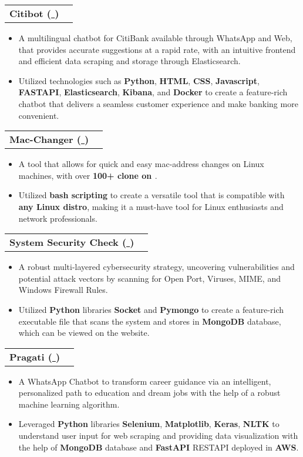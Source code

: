 \documentclass[letterpaper,11pt]{article}
\makeatletter
\newcommand{\myuline}[1]{%
  \uline{\phantom{#1}}%
  \llap{\contour{white}{#1}}%
}
\newcommand{\resumeItem}[1]{
  \item\small{
    {#1 \vspace{-1pt}}
  }
}
\newcommand{\resumeProjectHeading}[2]{
    \item
    \begin{tabular*}{\textwidth}{l@{\extracolsep{\fill}}r}
      #1 & {\color{dark-grey}} \\
    \end{tabular*}\vspace{-4pt}
}
\newcommand{\resumeItemListStart}{\begin{itemize}}
\newcommand{\resumeItemListEnd}{\end{itemize}\vspace{0pt}}
\makeatother
\begin{document}
     \resumeProjectHeading
          {\textbf{Citibot
          (\href{https://github.com/samrath-sudesh-acharya/Citibot}{\myuline {GitHub}})}}{Sept. 2020 -- Nov. 2020}
          \resumeItemListStart
            \resumeItem{A multilingual chatbot for CitiBank available through WhatsApp and Web, that provides accurate suggestions at a rapid rate, with an intuitive frontend and efficient data scraping and storage through Elasticsearch.}
            \resumeItem{Utilized technologies such as \textbf{Python}, \textbf{HTML}, \textbf{CSS}, \textbf{Javascript}, \textbf{FASTAPI}, \textbf{Elasticsearch}, \textbf{Kibana}, and \textbf{Docker} to create a feature-rich chatbot that delivers a seamless customer experience and make banking more convenient.}
          \resumeItemListEnd
          
    \resumeProjectHeading
          {\textbf{Mac-Changer
          (\href{https://github.com/samrath-sudesh-acharya/Mac-Changer}{\myuline {GitHub}})}}{Sept. 2020 -- Nov. 2020}
          \resumeItemListStart
            \resumeItem{A tool that allows for quick and easy mac-address changes on Linux machines, with over {\textbf{100+ clone on \myuline{GitHub}}}.}
            \resumeItem{Utilized \textbf{bash scripting} to create a versatile tool that is compatible with \textbf{any Linux distro}, making it a must-have tool for Linux enthusiasts and network professionals.}
          \resumeItemListEnd
          
     \resumeProjectHeading
          {\textbf{System Security Check (\href{https://github.com/samrath-sudesh-acharya/SystemSecuirtyCheck}{\myuline {GitHub}})}}{Sept. 2020 -- Nov. 2020}
          \resumeItemListStart
            \resumeItem{A robust multi-layered cybersecurity strategy, uncovering vulnerabilities and potential attack vectors by scanning for Open Port, Viruses, MIME, and Windows Firewall Rules.}
            \resumeItem{Utilized \textbf{Python} libraries \textbf{Socket} and \textbf{Pymongo} to create a feature-rich executable file that scans the system and stores in  \textbf{MongoDB} database, which can be viewed on the website.}
          \resumeItemListEnd  
          
    \resumeProjectHeading
          {\textbf{Pragati (\href{https://github.com/samrath-sudesh-acharya/Education-Chatbot-}{\myuline {GitHub}})}}{Sept. 2020 -- Nov. 2020}
          \resumeItemListStart
            \resumeItem{A WhatsApp Chatbot to transform career guidance via an intelligent, personalized path to education and dream jobs with the help of a robust machine learning algorithm.}
            \resumeItem{Leveraged \textbf{Python} libraries \textbf{Selenium}, \textbf{Matplotlib}, \textbf{Keras}, \textbf{NLTK} to understand user input for web scraping and providing data visualization with the help of \textbf{MongoDB} database and \textbf{FastAPI} RESTAPI deployed in \textbf{AWS}.}
          \resumeItemListEnd  
          
\end{document}
